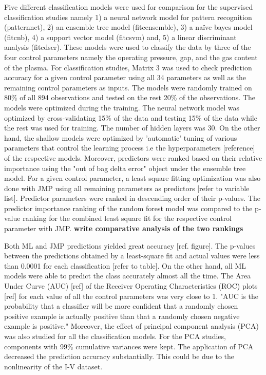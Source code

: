 \documentclass[12pt]{iopart}
\begin{document}
Five different classification models were used for comparison for the supervised classification studies namely 1) a neural network model for pattern recognition (patternnet), 2) an ensemble tree model (fitcensemble), 3) a naïve bayes model (fitcnb), 4) a support vector model (fitcsvm) and, 5) a linear discriminant analysis (fitcdscr). These models were used to classify the data by three of the four control parameters namely the operating pressure, gap, and the gas content of the plasma. For classification studies, Matrix 3 was used to check prediction accuracy for a given control parameter using all 34 parameters as well as the remaining control parameters as inputs. The models were randomly trained on 80\% of all 894 observations and tested on the rest 20\% of the observations. The models were optimized during the training. The neural network model was optimized by cross-validating 15\% of the data and testing 15\% of the data while the rest was used for training. The number of hidden layers was 30. On the other hand, the shallow models were optimized by 'automatic' tuning of various parameters that control the learning process i.e the hyperparameters [reference] of the respective models. Moreover, predictors were ranked based on their relative importance using the "out of bag delta error" object under the ensemble tree model. For a given control parameter, a least square fitting optimization was also done with JMP using all remaining parameters as predictors [refer to variable list]. Predictor parameters were ranked in descending order of their p-values. The predictor importance ranking of the random forest model was compared to the p-value ranking for the combined least square fit for the respective control parameter with JMP. \textbf{write comparative analysis of the two rankings}

Both ML and JMP predictions yielded great accuracy [ref. figure]. The p-values between the predictions obtained by a least-square fit and actual values were less than 0.0001 for each classification [refer to table]. On the other hand, all ML models were able to predict the class accurately almost all the time. The Area Under Curve (AUC) [ref] of the Receiver Operating Characteristics (ROC) plots [ref] for each value of all the control parameters was very close to 1. "AUC is the probability that a classifier will be more confident that a randomly chosen positive example is actually positive than that a randomly chosen negative example is positive." Moreover, the effect of principal component analysis (PCA) was also studied for all the classification models. For the PCA studies, components with 99\% cumulative variances were kept. The application of PCA decreased the prediction accuracy substantially. This could be due to the nonlinearity of the I-V dataset.
\end{document}
